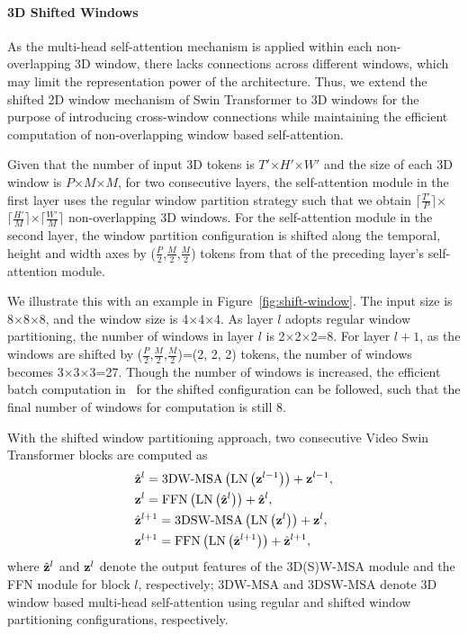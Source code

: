 \documentclass{article}
\begin{document}
\paragraph{3D Shifted Windows}\label{sec:att}
As the multi-head self-attention mechanism is applied within each non-overlapping 3D window, there lacks connections across different windows, which may limit the representation power of the architecture. Thus, we extend the shifted 2D window mechanism of Swin Transformer to 3D windows for the purpose of introducing cross-window connections while maintaining the efficient computation of non-overlapping window based self-attention.

Given that the number of input 3D tokens is $T'$$\times$$H'$$\times$$W'$ and the size of each 3D window is $P$$\times$$M$$\times$$M$, for two consecutive layers, the self-attention module in the first layer uses the regular window partition strategy such that we obtain $\lceil\frac{T'}{P}\rceil$$\times$$\lceil\frac{H'}{M}\rceil$$\times$$\lceil\frac{W'}{M}\rceil$ non-overlapping 3D windows. For the self-attention module in the second layer, the window partition configuration is shifted along the temporal, height and width axes by ($\frac{P}{2}$,$\frac{M}{2}$,$\frac{M}{2}$) tokens from that of the preceding layer's self-attention module.

We illustrate this with an example in Figure~\ref{fig:shift-window}. The input size is 8$\times$8$\times$8, and the window size is 4$\times$4$\times$4. As layer $l$ adopts regular window partitioning, the number of windows in layer $l$ is 2$\times$2$\times$2=8. For layer $l+1$, as the windows are shifted by ($\frac{P}{2}$,$\frac{M}{2}$,$\frac{M}{2}$)=(2, 2, 2) tokens, the number of windows becomes 3$\times$3$\times$3=27. Though the number of windows is increased, the efficient batch computation in~\cite{liu2021swin} for the shifted configuration can be followed, such that the final number of windows for computation is still 8.



With the shifted window partitioning approach, two consecutive Video Swin Transformer blocks are computed as
\begin{align}
    &{{\hat{\bf{z}}}^{l}} = \text{3DW-MSA}\left( {\text{LN}\left( {{{\bf{z}}^{l - 1}}} \right)} \right) + {\bf{z}}^{l - 1},\nonumber\\
    &{{\bf{z}}^l} = \text{FFN}\left( {\text{LN}\left( {{{\hat{\bf{z}}}^{l}}} \right)} \right) + {{\hat{\bf{z}}}^{l}},\nonumber\\
    &{{\hat{\bf{z}}}^{l+1}} = \text{3DSW-MSA}\left( {\text{LN}\left( {{{\bf{z}}^{l}}} \right)} \right) + {\bf{z}}^{l}, \nonumber\\
    &{{\bf{z}}^{l+1}} = \text{FFN}\left( {\text{LN}\left( {{{\hat{\bf{z}}}^{l+1}}} \right)} \right) + {{\hat{\bf{z}}}^{l+1}}, \label{eq.swin}
\end{align}
where ${\hat{\bf{z}}}^l$ and ${\bf{z}}^l$ denote the output features of the 3D(S)W-MSA module and the FFN module for block $l$, respectively; $\text{3DW-MSA}$ and $\text{3DSW-MSA}$ denote 3D window based multi-head self-attention using regular and shifted window partitioning configurations, respectively.
\end{document}
